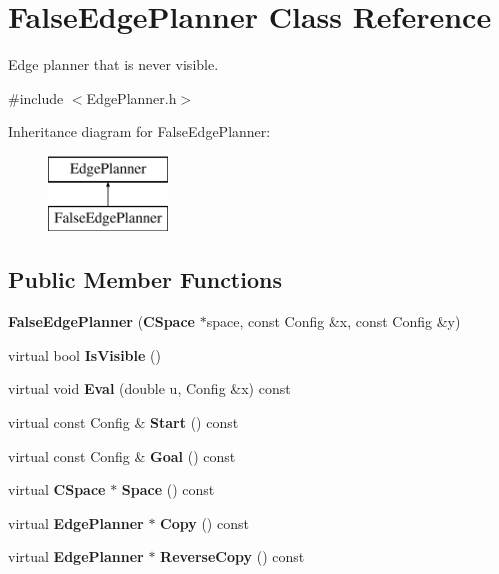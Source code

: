 \section{False\+Edge\+Planner Class Reference}
\label{classFalseEdgePlanner}


Edge planner that is never visible.  




{\ttfamily \#include $<$Edge\+Planner.\+h$>$}

Inheritance diagram for False\+Edge\+Planner\+:\begin{figure}[H]
\begin{center}
\leavevmode
\includegraphics[height=2.000000cm]{classFalseEdgePlanner}
\end{center}
\end{figure}
\subsection*{Public Member Functions}
\begin{DoxyCompactItemize}
\item 
{\bfseries False\+Edge\+Planner} ({\bf C\+Space} $\ast$space, const Config \&x, const Config \&y)\label{classFalseEdgePlanner_ab4372dd7f150d1a45f3f1f924a823392}

\item 
virtual bool {\bfseries Is\+Visible} ()\label{classFalseEdgePlanner_abb7e67a0720697bcade50715c6dc663d}

\item 
virtual void {\bfseries Eval} (double u, Config \&x) const \label{classFalseEdgePlanner_a9da01f9447a410ebada0bf57e34ca51d}

\item 
virtual const Config \& {\bfseries Start} () const \label{classFalseEdgePlanner_a0f230c81b2e01037745a04b90109ce55}

\item 
virtual const Config \& {\bfseries Goal} () const \label{classFalseEdgePlanner_a0eedee8131e9ce77467ecfdb2303f911}

\item 
virtual {\bf C\+Space} $\ast$ {\bfseries Space} () const \label{classFalseEdgePlanner_aac2a49352387d7a02611544a159dabdd}

\item 
virtual {\bf Edge\+Planner} $\ast$ {\bfseries Copy} () const \label{classFalseEdgePlanner_a9ec7ec6d3338aca3cf2245d390216925}

\item 
virtual {\bf Edge\+Planner} $\ast$ {\bfseries Reverse\+Copy} () const \label{classFalseEdgePlanner_adc7f028ecf7f04395939584a01d69806}

\end{DoxyCompactItemize}
